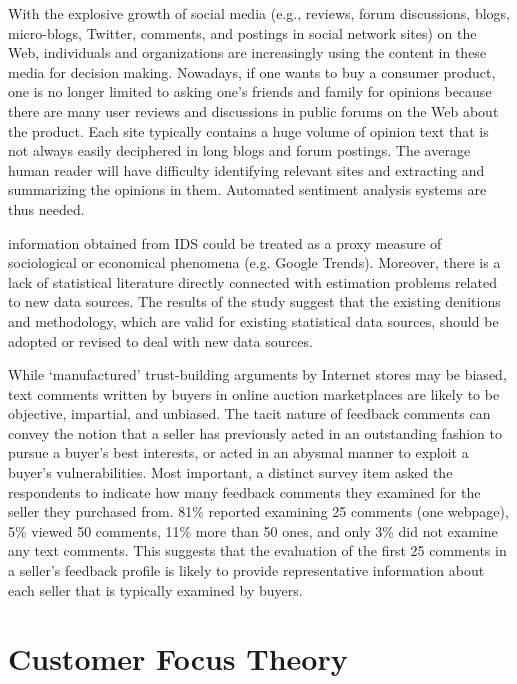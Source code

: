 \documentclass[a4paper, 11pt]{article}
\begin{document}
With the explosive growth of social media (e.g., reviews, forum discussions,
blogs, micro-blogs, Twitter, comments, and postings in social network sites)
on the Web, individuals and organizations are increasingly using the content
in these media for decision making. Nowadays, if one wants to buy a
consumer product, one is no longer limited to asking one’s friends and
family for opinions because there are many user reviews and discussions in
public forums on the Web about the product. 
Each site
typically contains a huge volume of opinion text that is not always easily
deciphered in long blogs and forum postings. The average human reader will
have difficulty identifying relevant sites and extracting and summarizing the
opinions in them. Automated sentiment analysis systems are thus needed.\cite{liu2012sentiment}

information obtained from IDS
could be treated as a proxy measure of sociological or economical phenomena (e.g. Google
Trends). Moreover, there is a lack of statistical literature directly connected with estimation
problems related to new data sources. The results of the study suggest that the existing denitions and methodology, which are
valid for existing statistical data sources, should be adopted or revised to deal with new data
sources. \cite{berkesewicz2015representativeness}

While ‘manufactured’ trust-building arguments by Internet stores may be biased, text comments written by buyers in online auction marketplaces are likely to be objective, impartial, and unbiased. The tacit nature of feedback comments can convey the notion that a seller has previously acted in an outstanding fashion to pursue a buyer’s best interests, or acted in an abysmal manner to exploit a buyer’s vulnerabilities.
Most important, a distinct survey item asked the respondents to indicate how many feedback comments they examined for the seller they purchased from. 81\% reported examining 25 comments (one webpage), 5\% viewed 50 comments, 11\% more than 50 ones, and only 3\% did not examine any text comments. This suggests that the evaluation of the first 25 comments in a seller’s feedback profile is likely to provide representative information about each seller that is typically examined by buyers. \cite{pavlou2006institutional,pavlou2006nature} 
\section{Customer Focus Theory}
\label{sec:CFTH}
\end{document}
